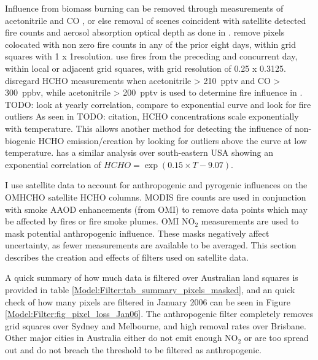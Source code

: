   Influence from biomass burning can be removed through measurements of acetonitrile and CO \parencite[e.g.,][]{Wolfe2016, Miller2017}, or else removal of scenes coincident with satellite detected fire counts and aerosol absorption optical depth as done in \textcite{Marais2014}.
  \textcite{Marais2012} remove pixels colocated with non zero fire counts in any of the prior eight days, within grid squares with 1 x 1\degr resolution.
  \textcite{Barkley2013} use fires from the preceding and concurrent day, within local or adjacent grid squares, with grid resolution of 0.25 x 0.3125\degr.
  \textcite{Wolfe2016} disregard HCHO measurements when acetonitrile > 210~pptv and CO > 300~ppbv, while acetonitrile > 200~pptv is used to determine fire influence in \textcite{Miller2017}.
  TODO: look at yearly correlation, compare to exponential curve and look for fire outliers
  As seen in TODO: citation, HCHO concentrations scale exponentially with temperature.
  This allows another method for detecting the influence of non-biogenic HCHO emission/creation by looking for outliers above the curve at low temperature.
  \textcite{Zhu2013_poster} has a similar analysis over south-eastern USA showing an exponential correlation of ${HCHO} = \exp(0.15\times{T}-9.07)$.
  
  I use satellite data to account for anthropogenic and pyrogenic influences on the OMHCHO satellite HCHO columns.
  MODIS fire counts are used in conjunction with smoke AAOD enhancements (from OMI) to remove data points which may be affected by fires or fire smoke plumes.
  OMI NO$_2$ measurements are used to mask potential anthropogenic influence.  
  These masks negatively affect uncertainty,  as fewer measurements are available to be averaged.
  This section describes the creation and effects of filters used on satellite data.
  
  A quick summary of how much data is filtered over Australian land squares is provided in table \ref{Model:Filter:tab_summary_pixels_masked}, and an quick check of how many pixels are filtered in January 2006 can be seen in Figure \ref{Model:Filter:fig_pixel_loss_Jan06}.
  The anthropogenic filter completely removes grid squares over Sydney and Melbourne, and high removal rates over Brisbane. 
  Other major cities in Australia either do not emit enough NO$_2$ or are too spread out and do not breach the threshold to be filtered as anthropogenic.
  
